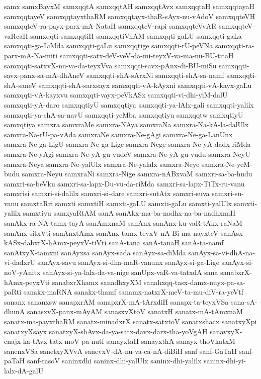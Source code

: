 {samx
samxBayxM
samxqqtA
samxqqtAH
samxqqtAvx
samxqqtaH
samxqqtayaH
samxqqtayeV
samxqqtayxthaRM
samxqqtayx-thaR-sAyx-nu-vAdoV
samxqqteVH
samxqqteV-ra-payx-parx-mA-NataH
samxqqteV-rapi
samxqqteVvAR
samxqqteV-vaRcaH
samxqqti
samxqqtiH
samxqqtiVnAM
samxqqti-gaLU
samxqqti-gaLa
samxqqti-ga-LiMda
samxqqti-gaLu
samxqqtige
samxqqti-rU-peVNa
samxqqti-ra-parx-mA-Na-miti
samxqqti-satx-deV-veV-da-mi-teyxV-va-ma-nu-BU-titaH
samxqqti-satxvX-nu-va-da-teyxVva
samxqqti-savx-pAnx-di-BU-miSu
samxqqti-savx-panx-sa-mA-dhAneV
samxqqti-shA-sArxNi
samxqqti-shA-sa-namf
samxqqti-shA-saneV
samxqqti-shA-sarxsayx
samxqqti-vA-kAyxni
samxqqti-vA-kayx-gaLu
samxqqti-vA-kayxvu
samxqqti-vayx-peVkASx
samxqqti-vi-dhi-yiM-dalU
samxqqti-yA-daro
samxqqtiyU
samxqqtiya
samxqqti-ya-lAlx-gali
samxqqti-yalilx
samxqqti-ya-shA-sa-navU
samxqqti-yeMba
samxqqtiyu
samxqqtw
samxqtiyU
samxqtiya
samxra
samxraMe
samxra-NAya
samxraNa
samxra-Na-kA-la-dalUlx
samxra-Na-rU-pa-vAda
samxraNe
samxra-Ne-gAgi
samxra-Ne-ga-LanUnx
samxra-Ne-ga-LigU
samxra-Ne-ga-Lige
samxra-Nege
samxra-Ne-yA-dadx-riMda
samxra-Ne-yAgi
samxra-Ne-yA-gu-vudeV
samxra-Ne-yA-gu-vudu
samxra-NeyU
samxra-Neya
samxra-Ne-yalUlx
samxra-Ne-yalalx
samxra-Neye
samxra-Ne-yeM-budu
samxra-Neyu
samxraNi
samxra-Nige
samxra-nABxvaM
samxri-sa-ba-hudu
samxri-sa-beVku
samxri-sa-lapx-Du-vu-da-riMda
samxri-sa-lapx-TiTx-ru-vanu
samxrisi
samxri-si-dalilx
samxri-si-dare
samxri-sutAtx
samxri-suva
samxri-su-vanu
samxtaRri
samxti
samxtiH
samxti-gaLU
samxti-gaLu
samxti-yalUlx
samxti-yalilx
samxtiyu
samxyaRtAM
sanA
sanAkx-ma-ba-nadhx-na-ba-nadhxnaH
sanAkx-ra-NA-tamx-tayA
sanAmxnaM
sanAnx
sanAnx-ku-vaR-tAkx-raNaM
sanAnx-sitxVti
sanAnxtAmx
sanAnx-tamx-tevxV-nA-Bi-ma-nayxteV
sanAsx-kASx-dabxrX-hAmx-peyxV-tiVti
sanA-tana
sanA-tanaH
sanA-ta-namf
sanAtxyX-tamxni
sanAyxsa
sanAyx-sada
sanAyx-sa-diMda
sanAyx-sa-vi-dhA-na-vi-dadxrU
sanAyx-savu
sanAyx-si-dha-maR-vanunx
sanAyx-si-ga-Lige
sanAyx-si-noV-yAnitx
sanAyx-si-ya-lalx-da-va-nige
sanUpx-vaR-va-tatxdA
sana
sanabxrX-hAmx-peyxVti
sanabxrXhamx
sanadhxyXM
sanahxqq-tasx-damx-nuyx-pa-sa-paRti
sanakx-maRNA
sanakx-thamf
sanamx-natxrX-meV-ta-mu-diV-ra-yeVtf
sananx
sananxsw
sanapxrAM
sanapxrX-mA-tArxdiH
sanapx-ta-teyxVSa
sana-sA-dhunA
sanasxvX-panx-mAyAM
sanasxvXtoV
sanatxH
sanatx-mA-tAmxnaM
sanatx-ma-payxthaRM
sanatx-minadxrX
sanatx-satxtoV
sanatxshacx
sanatxyXpi
sanatxyXsayx
sanatxyX-shAvx-da-ya-satx-davx-darx-tha-yoVgAH
sanavxyX-cnajx-ka-tAvx-tatx-moV-pa-nutf
sanayxtaH
sanayxthA
sanayx-thoVkatxM
sanenxVSa
sanetxyXVvA
sanevxV-dA-nu-va-ca-nA-diBiH
sanf
sanf-GaTaH
sanf-paTaH
sanf-rasoV
saninxdhi
saninx-dhi-yalUlx
saninx-dhi-yalilx
saninx-dhi-yi-lalx-dA-galU
}
